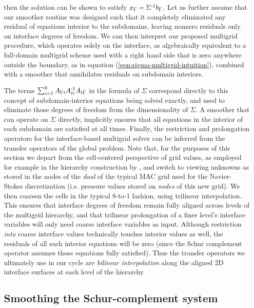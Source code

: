 then the solution can be shown to satisfy $x_\Gamma=\Sigma^{\operatorname{-1}}b_\Gamma$. Let us further assume that our smoother routine was designed such that it completely
eliminated any residual of equations interior to the subdomains, leaving nonzero residuals only on interface degrees of freedom. We can then interpret our proposed
multigrid procedure, which operates solely on the interface, as algebraically
equivalent to a full-domain multigrid scheme used with a right hand side that is zero
anywhere outside the boundary, as in equation (\ref{eqn:sigma-multigrid-intuition}), combined with a smoother that annihilates residuals on
subdomain interiors.

The terms $\sum_{i=1}^k A_{\Gamma i}A_{ii}^{\operatorname{-1}}A_{i \Gamma}$ in the formula of $\Sigma$ correspond directly to this concept of subdomain-interior equations
being solved exactly, and used to eliminate those degrees of freedom from the dimensionality of $\Sigma$. A smoother that can operate on $\Sigma$ directly,
implicitly ensures that all equations in the interior of each subdomain are satisfied at all times. Finally, the restriction and prolongation operators for the
interface-based multigrid solver can be inferred from the transfer operators of the global problem. Note that, for the purposes of this section we depart from the
cell-centered perspective of grid values, as employed for example in the hierarchy construction by \cite{mcadams2010parallel},
and switch to viewing unknowns as stored in the nodes of the \emph{dual} of the typical MAC grid used for the Navier-Stokes discretization (i.e. pressure values
stored on \emph{nodes} of this new grid). We then coarsen the cells in the typical 8-to-1 fashion, using trilinear interpolation. This ensures that interface degrees
of freedom remain fully aligned across levels of the multigrid hierarchy, and that trilinear prolongation of a finer level's interface variables will only need
coarse interface variables as input. Although restriction \emph{into} coarse interface values technically touches interior values as well, the residuals of all such
interior equations will be zero (since the Schur complement operator assumes those equations fully satisfied). Thus the transfer operators we ultimately use in our
cycle are \emph{bilinear interpolation} along the aligned 2D interface surfaces at each level of the hierarchy.


\subsection{Smoothing the Schur-complement system}
\label{sec:schur-complement-smoother}

